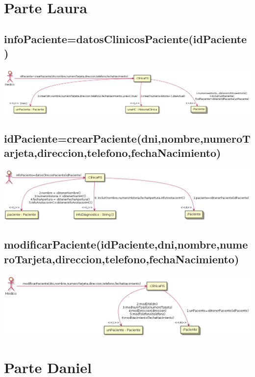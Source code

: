\documentclass[10pt,a4paper,spanish]{report}
\begin{document}
\section*{Parte Laura}

\subsection*{infoPaciente=datosClinicosPaciente(idPaciente)}
\begin{center}
	\includegraphics[scale=0.6]{datosClinicosPaciente.png}
\end{center}

\subsection*{idPaciente=crearPaciente(dni,nombre,numeroTarjeta,direccion,telefono,fechaNacimiento)}
\begin{center}
	\includegraphics[scale=0.6]{crearPaciente.png}
\end{center}

\subsection*{modificarPaciente(idPaciente,dni,nombre,numeroTarjeta,direccion,telefono,fechaNacimiento)}
\begin{center}
	\includegraphics[scale=0.6]{modificarPaciente.png}
\end{center}

\section*{Parte Daniel}
\end{document}
